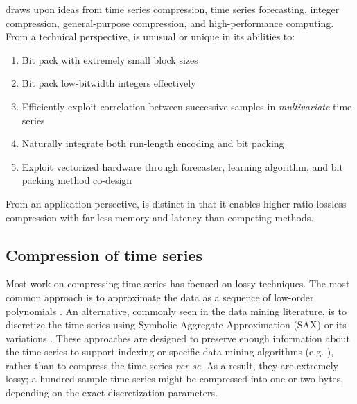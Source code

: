 
\minesp draws upon ideas from time series compression, time series forecasting, integer compression, general-purpose compression, and high-performance computing. From a technical perspective, \minesp is unusual or unique in its abilities to:
\begin{enumerate}
    \item Bit pack with extremely small block sizes
    \item Bit pack low-bitwidth integers effectively
    \item Efficiently exploit correlation between successive samples in \textit{multivariate} time series
    \item Naturally integrate both run-length encoding and bit packing
    \item Exploit vectorized hardware through forecaster, learning algorithm, and bit packing method co-design
\end{enumerate}
From an application persective, \minesp is distinct in that it enables higher-ratio lossless compression with far less memory and latency than competing methods.




\subsection{Compression of time series}

Most work on compressing time series has focused on lossy techniques. The most common approach is to approximate the data as a sequence of low-order polynomials \cite{swab, lemireSegmentation, tsCompressSmartGrid, iotCompressCrap, apca, paa}. An alternative, commonly seen in the data mining literature, is to discretize the time series using Symbolic Aggregate Approximation (SAX) \cite{sax} or its variations \cite{isax, isax2}. These approaches are designed to preserve enough information about the time series to support indexing or specific data mining algorithms (e.g. \cite{isax, fastShapelet, hotSax}), rather than to compress the time series \textit{per se}. As a result, they are extremely lossy; a hundred-sample time series might be compressed into one or two bytes, depending on the exact discretization parameters. %

